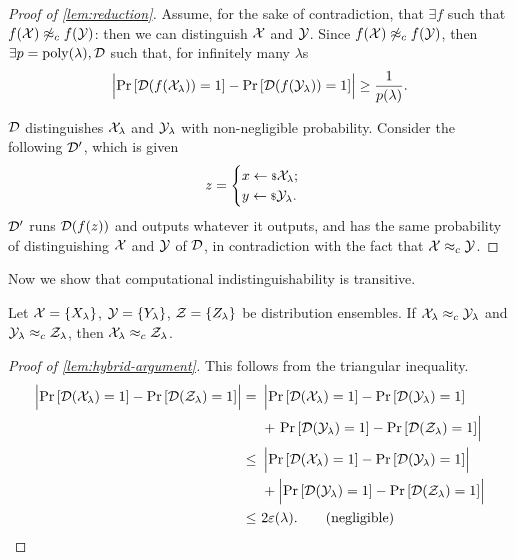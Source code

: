 \begin{proof}[Proof of \cref{lem:reduction}]
	Assume, for the sake of contradiction, that $\exists f$ such that $f(\mathcal{X}) \not \approx_c f(\mathcal{Y})$: then we can distinguish $\mathcal{X}$ and $\mathcal{Y}$.
	Since $f(\mathcal{X}) \not \approx_c f(\mathcal{Y})$, then $\exists p = \mathrm{poly}(\lambda), \mathcal{D}$ such that, for infinitely many $\lambda$s
	\begin{equation*}
		\left|{\mathop{\mathrm{Pr}}\limits_{} \left[ {\mathcal{D}(f(\mathcal{X}_{\lambda})) = 1} \right] - \mathop{\mathrm{Pr}}\limits_{} \left[ {\mathcal{D}(f(\mathcal{Y}_{\lambda})) = 1} \right]}\right| \ge \frac{1}{p(\lambda)}.
	\end{equation*}

	$\mathcal{D}$ distinguishes $\mathcal{X}_{\lambda}$ and $\mathcal{Y}_{\lambda}$ with non-negligible probability.
	Consider the following $\mathcal{D}'$, which is given
	\begin{equation*}
		z =
		\begin{cases}
			x \leftarrow {\scriptstyle \$} {\mathcal{X}_{\lambda}}; \\
			y \leftarrow {\scriptstyle \$} {\mathcal{Y}_{\lambda}}. \\
		\end{cases}
	\end{equation*}
	$\mathcal{D}'$ runs $\mathcal{D}(f(z))$ and outputs whatever it outputs, and has the same probability of distinguishing $\mathcal{X}$ and $\mathcal{Y}$ of $\mathcal{D}$, in contradiction with the fact that $\mathcal{X} \approx_c \mathcal{Y}$.
\end{proof}

Now we show that computational indistinguishability is transitive.

\begin{lemma} \label{lem:hybrid-argument}
	Let $\mathcal{X} = \{X_{\lambda}\}$, $\mathcal{Y} = \{ Y_{\lambda} \}$, $\mathcal{Z} = \{ Z_{\lambda} \}$ be distribution ensembles.
	If $\mathcal{X}_{\lambda} \approx_c \mathcal{Y}_{\lambda}$ and $\mathcal{Y}_{\lambda} \approx_c \mathcal{Z}_{\lambda}$, then $\mathcal{X}_{\lambda} \approx_c \mathcal{Z}_{\lambda}$.
\end{lemma}

\begin{proof}[Proof of \cref{lem:hybrid-argument}]
	This follows from the triangular inequality.
	\begin{align*}
		\left|{\mathop{\mathrm{Pr}}\limits_{} \left[ {\mathcal{D}(\mathcal{X}_{\lambda}) = 1} \right] - \mathop{\mathrm{Pr}}\limits_{} \left[ {\mathcal{D}(\mathcal{Z}_{\lambda}) = 1} \right]}\right|
		= &~
		\left| \mathop{\mathrm{Pr}}\limits_{} \left[ {\mathcal{D}(\mathcal{X}_{\lambda}) = 1} \right] - \mathop{\mathrm{Pr}}\limits_{} \left[ {\mathcal{D}(\mathcal{Y}_{\lambda}) = 1} \right] \right.
		\\
		&~+
		\left. \mathop{\mathrm{Pr}}\limits_{} \left[ {\mathcal{D}(\mathcal{Y}_{\lambda}) = 1} \right] - \mathop{\mathrm{Pr}}\limits_{} \left[ {\mathcal{D}(\mathcal{Z}_{\lambda}) = 1} \right] \right|
		\\
		\le &~
		\left|{\mathop{\mathrm{Pr}}\limits_{} \left[ {\mathcal{D}(\mathcal{X}_{\lambda}) = 1} \right] - \mathop{\mathrm{Pr}}\limits_{} \left[ {\mathcal{D}(\mathcal{Y}_{\lambda}) = 1} \right]}\right|
		\\
		&~+
		\left|{\mathop{\mathrm{Pr}}\limits_{} \left[ {\mathcal{D}(\mathcal{Y}_{\lambda}) = 1} \right] - \mathop{\mathrm{Pr}}\limits_{} \left[ {\mathcal{D}(\mathcal{Z}_{\lambda}) = 1} \right]}\right|
		\\
		\le &~2 \varepsilon(\lambda). \tag{negligible}
	\end{align*}
\end{proof}


